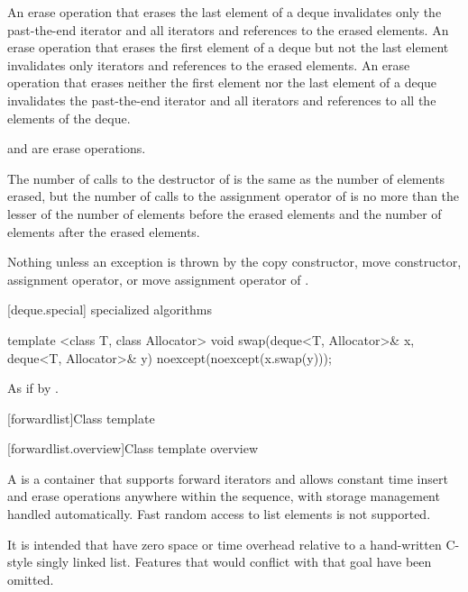 \begin{itemdescr}
\pnum
\effects
An erase operation that erases the last element of a deque invalidates only the past-the-end iterator
and all iterators and references to the erased elements. An erase operation that erases the first
element of a deque but not the last element invalidates only iterators
and references to the erased elements. An erase operation
that erases neither the first element nor the last element of a deque invalidates the past-the-end
iterator and all iterators and references to all the elements of the deque.
\begin{note}  and  are erase operations. \end{note}

\pnum
\complexity
The number of calls to the destructor of  is the same as the
number of elements erased, but the number of calls to the assignment operator of  is
no more than the lesser of the number of elements before the erased elements and the number of elements after the erased elements.

\pnum
\throws
Nothing unless an exception is thrown by the copy constructor, move constructor,
assignment operator, or move assignment operator of
.
\end{itemdescr}

[deque.special]{ specialized algorithms}

%
\begin{itemdecl}
template <class T, class Allocator>
  void swap(deque<T, Allocator>& x, deque<T, Allocator>& y)
    noexcept(noexcept(x.swap(y)));
\end{itemdecl}

\begin{itemdescr}
\pnum
\effects
As if by .
\end{itemdescr}

[forwardlist]{Class template }

[forwardlist.overview]{Class template  overview}

\pnum
A  is a container that supports forward iterators and allows
constant time insert and erase operations anywhere within the sequence, with storage
management handled automatically. Fast random access to list elements is not supported.
\begin{note} It is intended that  have zero space or time overhead
relative to a hand-written C-style singly linked list. Features that would conflict with
that goal have been omitted.\end{note}

